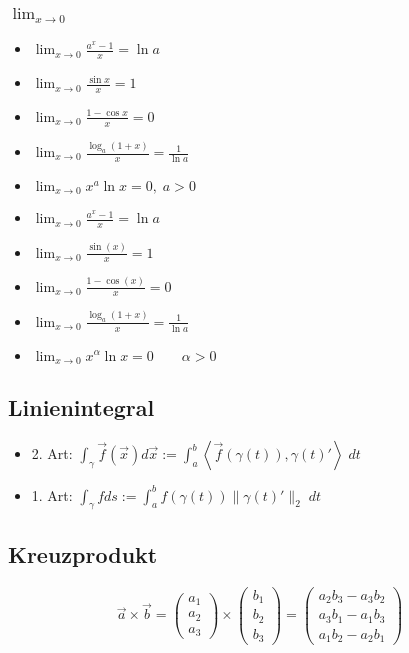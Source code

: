 \subsubsection*{$\lim_{x \to 0}$}
\begin{itemize}[leftmargin=*]
	\item $\lim_{x \to 0} \frac{a^x - 1}{x} = \ln a$
	\item $\lim_{x \to 0} \frac{\sin x}{x} = 1$
	\item $\lim_{x \to 0} \frac{1 - \cos x}{x} = 0$
	\item $\lim_{x \to 0} \frac{\log_a (1 + x)}{x} = \frac{1}{\ln a}$
	\item $\lim_{x \to 0} x^a \ln x = 0, \; a  > 0$
	\item $\lim_{x \to 0} \frac{a^x-1}{x} = \ln a$ 
	\item $\lim_{x \to 0} \frac{\sin(x)}{x} = 1$ 
	\item $\lim_{x \to 0} \frac{1-\cos(x)}{x} = 0 \quad$ 
	\item $\lim_{x \to 0} \frac{\log_a(1+x)}{x} = \frac{1}{\ln a}$
	\item $\lim_{x \to 0} x^\alpha \ln x = 0 \qquad \alpha > 0$
\end{itemize}

\subsection{Linienintegral}
\begin{itemize}[leftmargin=*]
	\item 2. Art: $\int_\gamma \vec{f}(\vec{x}) d\vec{x} := \int_a^b \left<
	\vec{f}(\gamma(t)), \gamma(t)' \right>\; dt$
	\item 1. Art: $\int_\gamma f ds := \int_a^b f(\gamma(t)) \|\gamma(t)'\|_2\; dt$
\end{itemize}

\subsection{Kreuzprodukt}
{\footnotesize
\[
\vec{a} \times \vec{b} = \left ( \begin{array}{c} a_1 \\ a_2 \\ a_3 \end{array}
\right ) \times
\left ( \begin{array}{c} b_1 \\ b_2 \\ b_3 \end{array}
\right ) =
\left ( \begin{array}{c} a_2b_3 - a_3b_2 \\ a_3b_1 - a_1b_3 \\ a_1b_2 - a_2b_1
\end{array} \right )
\]
}

